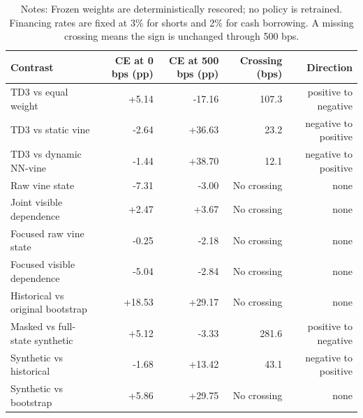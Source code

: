 \begin{table}[tbp]
\centering
\caption{Transaction-Cost Break-Even Robustness}
\label{tab:terminal-friction-crossings}
\small
\begin{tabular}{lrrrr}
\toprule
Contrast & CE at 0 bps (pp) & CE at 500 bps (pp) & Crossing (bps) & Direction \\
\midrule
TD3 vs equal weight & +5.14 & -17.16 & 107.3 & positive to negative \\
TD3 vs static vine & -2.64 & +36.63 & 23.2 & negative to positive \\
TD3 vs dynamic NN-vine & -1.44 & +38.70 & 12.1 & negative to positive \\
Raw vine state & -7.31 & -3.00 & No crossing & none \\
Joint visible dependence & +2.47 & +3.67 & No crossing & none \\
Focused raw vine state & -0.25 & -2.18 & No crossing & none \\
Focused visible dependence & -5.04 & -2.84 & No crossing & none \\
Historical vs original bootstrap & +18.53 & +29.17 & No crossing & none \\
Masked vs full-state synthetic & +5.12 & -3.33 & 281.6 & positive to negative \\
Synthetic vs historical & -1.68 & +13.42 & 43.1 & negative to positive \\
Synthetic vs bootstrap & +5.86 & +29.75 & No crossing & none \\
\bottomrule
\end{tabular}
\caption*{\footnotesize Notes: Frozen weights are deterministically rescored; no policy is retrained. Financing rates are fixed at 3\% for shorts and 2\% for cash borrowing. A missing crossing means the sign is unchanged through 500 bps.}
\end{table}
